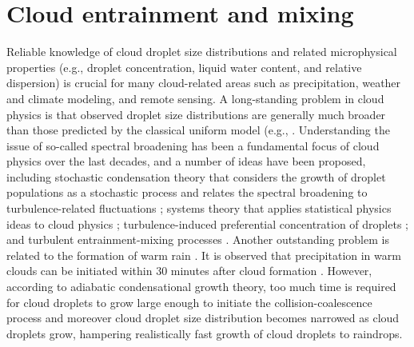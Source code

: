 \chapter{Cloud entrainment and mixing}
Reliable knowledge of cloud droplet size distributions and related microphysical properties (e.g., droplet concentration, liquid water content, and relative dispersion) is crucial for many cloud-related areas such as precipitation, weather and climate modeling, and remote sensing. A long-standing problem in cloud physics is that observed droplet size distributions are generally much broader than those predicted by the classical uniform model (e.g., \cite{Howell1949, HudsonYum1997, YumHudson2001, YumHudson2005}. Understanding the issue of so-called spectral broadening has been a fundamental focus of cloud physics over the last decades, and a number of ideas have been proposed, including stochastic condensation theory that considers the growth of droplet populations as a stochastic process and relates the spectral broadening to turbulence-related fluctuations \cite{Zhou1964, Sedunov1974, MacGrawLiu2006, KhvorostyanovCurry1999}; systems theory that applies statistical physics ideas to cloud physics \cite{Liu1995, LiuHallett1997, LiuHallett1998, Liu2002, Yano2016}; turbulence-induced preferential concentration of droplets \cite{Shaw1998}; and turbulent entrainment-mixing processes \cite{Warner1973, Baker1980, Hicks1990, TelfordChai1980, Su1998, Lu2013}. Another outstanding problem is related to the formation of warm rain \cite{McGrawLiu2003,MacGrawLiu2004}. It is observed that precipitation in warm clouds can be initiated within $30$ minutes after cloud formation \cite{RogersYau1996}. However, according to adiabatic condensational growth theory, too much time is required for cloud droplets to grow large enough to initiate the collision-coalescence process and moreover cloud droplet size distribution becomes narrowed as cloud droplets grow, hampering realistically fast growth of cloud droplets to raindrops. 

